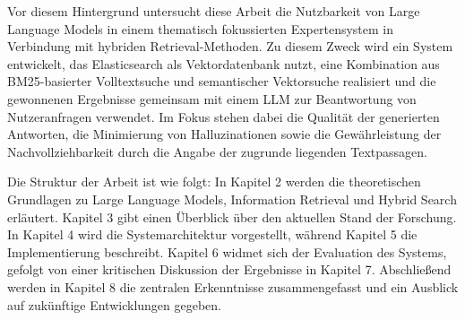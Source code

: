 Vor diesem Hintergrund untersucht diese Arbeit die Nutzbarkeit von Large Language Models in einem thematisch fokussierten Expertensystem in Verbindung mit hybriden Retrieval-Methoden. Zu diesem Zweck wird ein System entwickelt, das Elasticsearch als Vektordatenbank nutzt, eine Kombination aus BM25-basierter Volltextsuche und semantischer Vektorsuche realisiert und die gewonnenen Ergebnisse gemeinsam mit einem LLM zur Beantwortung von Nutzeranfragen verwendet. Im Fokus stehen dabei die Qualität der generierten Antworten, die Minimierung von Halluzinationen sowie die Gewährleistung der Nachvollziehbarkeit durch die Angabe der zugrunde liegenden Textpassagen.

Die Struktur der Arbeit ist wie folgt: In Kapitel 2 werden die theoretischen Grundlagen zu Large Language Models, Information Retrieval und Hybrid Search erläutert. Kapitel 3 gibt einen Überblick über den aktuellen Stand der Forschung. In Kapitel 4 wird die Systemarchitektur vorgestellt, während Kapitel 5 die Implementierung beschreibt. Kapitel 6 widmet sich der Evaluation des Systems, gefolgt von einer kritischen Diskussion der Ergebnisse in Kapitel 7. Abschließend werden in Kapitel 8 die zentralen Erkenntnisse zusammengefasst und ein Ausblick auf zukünftige Entwicklungen gegeben.
\clearpage
